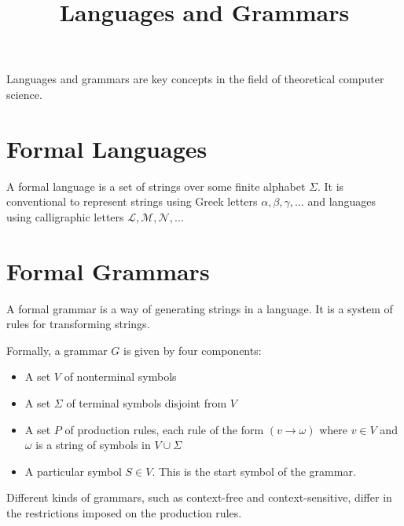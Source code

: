 \documentclass{article}
\begin{document}
\title{Languages and Grammars}
\maketitle

Languages and grammars are key concepts in the field of theoretical computer science.

\section{Formal Languages}

A formal language is a set of strings over some finite alphabet $ \Sigma $. It is conventional to represent strings using Greek letters $\alpha, \beta, \gamma, \ldots$ and languages using calligraphic letters $ \mathcal{L}, \mathcal{M}, \mathcal{N}, \ldots $

\section{Formal Grammars}

A formal grammar is a way of generating strings in a language. It is a system of rules for transforming strings.

Formally, a grammar $G$ is given by four components:

\begin{itemize}
\item A set $V$ of nonterminal symbols
\item A set $\Sigma$ of terminal symbols disjoint from $V$
\item A set $P$ of production rules, each rule of the form $ (v \rightarrow \omega) $ where $v \in V$ and $\omega$ is a string of symbols in $ V \cup \Sigma $
\item A particular symbol $S \in V$. This is the start symbol of the grammar.
\end{itemize}

Different kinds of grammars, such as context-free and context-sensitive, differ in the restrictions imposed on the production rules.
\end{document}

